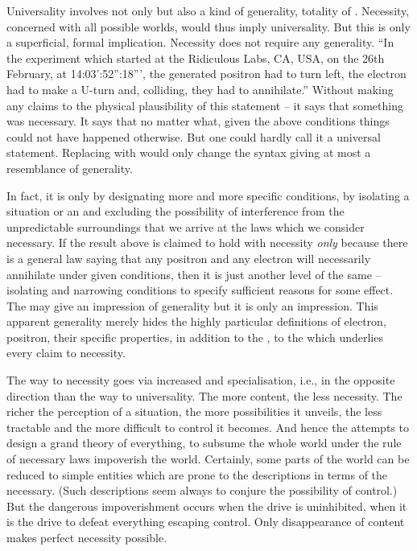 \pa Universality involves not only  but also a kind of
generality, totality of . Necessity, concerned with all possible
worlds, would thus imply universality. But this is only a superficial, formal
implication. Necessity does not require any generality.  ``In the experiment
which started at the Ridiculous Labs, CA, USA, on the 26th February, at
14:03':52'':18''', the generated positron had to turn left, the electron had to
make a U-turn and, colliding, they had to annihilate.''  Without making any
claims to the physical plausibility of this statement -- it says that something
was necessary.  It says that no matter what, given the above conditions things
could not have happened otherwise.  But one could hardly call it a universal
statement.  Replacing  with  would only change the syntax giving
at most a resemblance of generality.

In fact, it is only by designating more and more specific conditions, by
isolating a situation or an  and excluding the possibility of
interference from the unpredictable surroundings that we arrive at the laws
which we consider necessary. If the result above is claimed to hold with
necessity {\em only} because there is a general law saying that any positron and
any electron will necessarily annihilate under given conditions, then it is just
another level of the same -- isolating and narrowing conditions to specify
sufficient reasons for some effect.  The  may give an impression of
generality but it is only an impression. This apparent generality merely hides
the highly particular definitions of electron, positron, their specific
properties, in addition to the , to the  which underlies every claim to necessity.

The way to necessity goes via increased  and specialisation, i.e.,
in the opposite direction than the way to universality.  The more content, the
less necessity. The richer the perception of a situation, the more
possibilities it unveils, the less tractable and the more difficult to control
it becomes.  And hence the attempts to design a grand theory of everything, to
subsume the whole world under the rule of necessary laws impoverish the world.
Certainly, some parts of the world can be reduced to simple entities which are
prone to the descriptions in terms of the necessary. (Such descriptions seem
always to conjure the possibility of control.) 
But the dangerous impoverishment occurs when the drive is uninhibited, when it
is the drive to defeat everything escaping control.  Only disappearance of
content makes perfect necessity possible.



